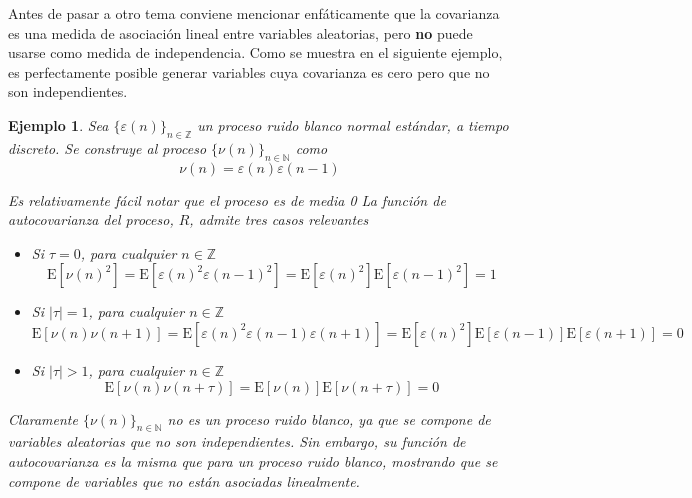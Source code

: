 \documentclass[12pt,letterpaper]{book}
\newtheorem{ejemplo}{Ejemplo}[chapter]
\newcommand{\N}{\mathbb{N}}
\newcommand{\Z}{\mathbb{Z}}
\newcommand{\E}[1]{\mathrm{E}\left[ #1 \right]}
\newcommand{\abso}[1]{\left| #1 \right|}
\begin{document}
Antes de pasar a otro tema conviene mencionar enfáticamente que la covarianza es una medida de asociación lineal entre variables aleatorias, pero \textbf{no} puede usarse como medida de independencia.
%
Como se muestra en el siguiente ejemplo, es perfectamente posible generar variables cuya covarianza es cero pero que no son independientes.

\begin{ejemplo}
Sea $\{ \varepsilon(n)\}_{n\in\Z}$ un proceso ruido blanco normal estándar, a tiempo discreto. Se construye al proceso $\{ \nu(n)\}_{n\in\N}$ como
\begin{equation}
\nu(n) = \varepsilon(n)\varepsilon(n-1)
\end{equation}

Es relativamente fácil notar que el proceso es de media 0
%
La función de autocovarianza del proceso, $R$, admite tres casos relevantes
\begin{itemize}
\item Si $\tau=0$, para cualquier $n\in \Z$
\begin{equation}
\E{\nu(n)^2} = \E{\varepsilon(n)^2\varepsilon(n-1)^2} = \E{\varepsilon(n)^2}\E{\varepsilon(n-1)^2} = 
1
\end{equation}
\item Si $\abso{\tau}=1$, para cualquier $n\in \Z$
\begin{equation}
\E{\nu(n)\nu(n+1)} = \E{\varepsilon(n)^2\varepsilon(n-1)\varepsilon(n+1)} = \E{\varepsilon(n)^2}\E{\varepsilon(n-1)}\E{\varepsilon(n+1)} = 0
\end{equation}
\item Si $\abso{\tau}>1$, para cualquier $n\in \Z$
\begin{equation}
\E{\nu(n)\nu(n+\tau)} = \E{\nu(n)}\E{\nu(n+\tau)} = 0
\end{equation}
\end{itemize}

Claramente $\{ \nu(n)\}_{n\in\N}$ no es un proceso ruido blanco, ya que se compone de variables aleatorias que no son independientes.
%
Sin embargo, su función de autocovarianza es la misma que para un proceso ruido blanco, mostrando que se compone de variables que no están asociadas linealmente. 
\end{ejemplo}
\end{document}
